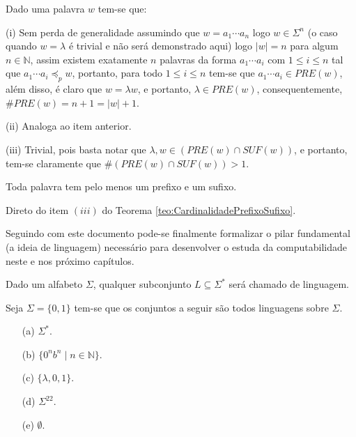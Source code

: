\begin{prova}
	Dado uma palavra $w$ tem-se que:
	\item[ (i)] Sem perda de generalidade assumindo que $w = a_1\cdots a_n$ logo $w \in \Sigma^n$ (o caso quando $w = \lambda$ é trivial e não será demonstrado aqui) logo $|w| = n$ para algum $n \in \mathbb{N}$, assim existem exatamente $n$ palavras da forma $a_1 \cdots a_i$ com $1 \leq i \leq n$ tal que $a_1 \cdots a_i \preceq_p w$, portanto, para todo $1 \leq i \leq n$ tem-se que $a_1 \cdots a_i \in PRE(w)$, além disso, é claro que $w = \lambda w$, e portanto, $\lambda \in PRE(w)$, consequentemente, $\#PRE(w) = n + 1 = |w| + 1$.
	\item[ (ii)] Analoga ao item anterior.
	\item[ (iii)] Trivial, pois basta notar que $\lambda, w \in (PRE(w) \cap SUF(w))$, e portanto, tem-se claramente que $\#(PRE(w) \cap SUF(w)) > 1$.
\end{prova}

\begin{corolario}
	Toda palavra tem pelo menos um prefixo e um sufixo.	
\end{corolario}

\begin{prova}
  Direto do item $(iii)$ do Teorema \ref{teo:CardinalidadePrefixoSufixo}.
\end{prova}

Seguindo com este documento pode-se finalmente formalizar o pilar fundamental (a ideia de linguagem) necessário para desenvolver o estuda da computabilidade neste e nos próximo capítulos.

\begin{definicao}[Linguagem]\label{def:Linguagem}
	Dado um alfabeto $\Sigma$, qualquer subconjunto $L \subseteq \Sigma^*$ será chamado de linguagem.
\end{definicao}

\begin{exemplo}
	Seja $\Sigma = \{0, 1\}$ tem-se que os conjuntos a seguir são todos linguagens sobre $\Sigma$.
	\begin{itemize}
		\item[(a)] $\Sigma^*$.
		\item[(b)] $\{0^nb^n \mid n \in \mathbb{N}\}$.
		\item[(c)] $\{\lambda, 0, 1\}$.
		\item[(d)] $\Sigma^{22}$.
		\item[(e)] $\emptyset$.
	\end{itemize}
\end{exemplo}

